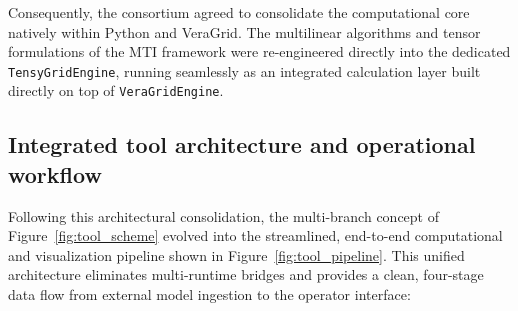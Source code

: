 Consequently, the consortium agreed to consolidate the computational core natively within Python and VeraGrid. The multilinear algorithms and tensor formulations of the MTI framework were re-engineered directly into the dedicated \texttt{TensyGridEngine}, running seamlessly as an integrated calculation layer built directly on top of \texttt{VeraGridEngine}.


\subsection{Integrated tool architecture and operational workflow}

Following this architectural consolidation, the multi-branch concept of Figure~\ref{fig:tool_scheme} evolved into the streamlined, end-to-end computational and visualization pipeline shown in Figure~\ref{fig:tool_pipeline}. This unified architecture eliminates multi-runtime bridges and provides a clean, four-stage data flow from external model ingestion to the operator interface:

